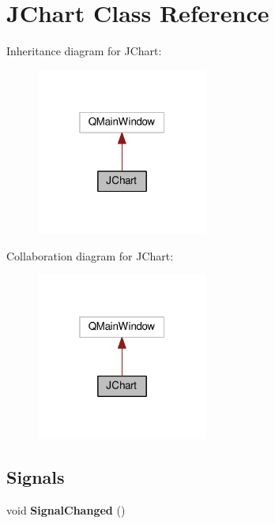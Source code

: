 \hypertarget{class_j_chart}{}\section{J\+Chart Class Reference}
\label{class_j_chart}


Inheritance diagram for J\+Chart\+:\nopagebreak
\begin{figure}[H]
\begin{center}
\leavevmode
\includegraphics[width=160pt]{class_j_chart__inherit__graph}
\end{center}
\end{figure}


Collaboration diagram for J\+Chart\+:\nopagebreak
\begin{figure}[H]
\begin{center}
\leavevmode
\includegraphics[width=160pt]{class_j_chart__coll__graph}
\end{center}
\end{figure}
\subsection*{Signals}
\begin{DoxyCompactItemize}
\item 
void {\bfseries Signal\+Changed} ()\hypertarget{class_j_chart_ab59324b8e03f64b90c9e414f7ff22a00}{}\label{class_j_chart_ab59324b8e03f64b90c9e414f7ff22a00}

\end{DoxyCompactItemize}
